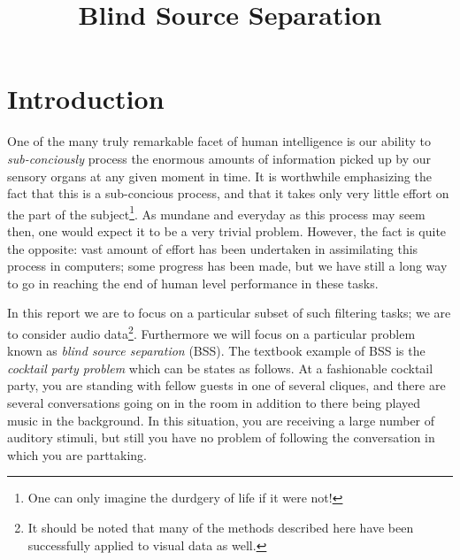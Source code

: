 \documentclass[11pt, oneside, a4paper]{report}
\begin{document}

\title{Blind Source Separation}
\author{}
\date{}    %
\maketitle

\begin{abstract}

\end{abstract}

\tableofcontents
\listoffigures

\chapter{Introduction}


One of the many truly remarkable facet of human intelligence is our
ability to \emph{sub-conciously} process the enormous amounts
of information picked up by our sensory organs at any given moment in
time. It is worthwhile emphasizing the fact that this is a
sub-concious process, and that it takes only very little effort on the
part of the subject\footnote{One can only imagine the durdgery of life
if it were not!}. As mundane and everyday as this process may seem
then, one would expect it to be a very trivial problem. However, the
fact is quite the opposite: vast amount of effort has been undertaken in assimilating this process in
computers; some progress has been made, but we have still a long way
to go in reaching the end of human level performance in these tasks.

In this report we are to focus on a particular subset of such
filtering tasks; we are to consider audio data\footnote{It should be
 noted that many of the methods described here have been successfully
applied to visual data as well.}. Furthermore we will focus on a
particular problem known as \emph{blind source separation} (BSS). The
textbook example of BSS is the \emph{cocktail party problem} which can
be states as follows. At a fashionable cocktail party, you are
standing with fellow guests in one of several cliques, and there are
several conversations going on in the room in addition to there being
played music in the background. In this situation, you are receiving a
large number of auditory stimuli, but still you have no problem of
following the conversation in which you are parttaking. 
\end{document}
